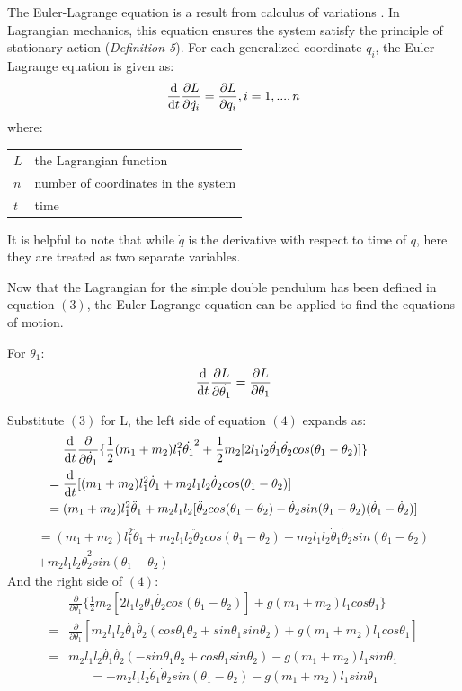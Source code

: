 \documentclass[a4paper,12pt]{article}
\makeatletter
\newenvironment{conditions}
  {\par\vspace{\abovedisplayskip}\noindent\begin{tabular}{>{$}l<{$} @{${}={}$} l}}
  {\end{tabular}\par\vspace{\belowdisplayskip}}
\makeatother
\begin{document}
The Euler-Lagrange equation is a result from calculus of variations \cite{fox-2010}. In Lagrangian mechanics, this equation ensures the system satisfy the principle of stationary action (\textit{Definition 5}). For each generalized coordinate $q_i$, the Euler-Lagrange equation is given as:
\[
\dv{}{t}\frac{\partial L}{\partial \dot{q_i}}=\frac{\partial L}{\partial q_i}, i = 1,...,n
\]
where:
\begin{conditions}
    L & the Lagrangian function\\
    n & number of coordinates in the system\\
    t & time
\end{conditions}
It is helpful to note that while $\dot{q}$ is the derivative with respect to time of $q$, here they are treated as two separate variables.

Now that the Lagrangian for the simple double pendulum has been defined in equation $(3)$, the Euler-Lagrange equation can be applied to find the equations of motion. 

For $\theta_1$:
\begin{equation}
    \dv{}{t}\frac{\partial L}{\partial \dot{\theta_1}}=\frac{\partial L}{\partial \theta_1}
    \end{equation}

Substitute $(3)$ for L, the left side of equation $(4)$ expands as:
\begin{align*}
    &\dv{}{t}\frac{\partial}{\partial \dot \theta_1}
    \{\frac{1}{2}(m_1+m_2)l_1^2\dot{\theta_1}^2+\frac{1}{2}m_2[2l_1l_2\dot{\theta_1}\dot{\theta_2}cos(\theta_1-\theta_2)]\}
    \\
    ={} &\dv{}{t}[(m_1+m_2)l_1^2\dot \theta_1+m_2l_1l_2\dot \theta_2cos(\theta_1-\theta_2)]
    \\
    ={} &(m_1+m_2)l_1^2\ddot\theta_1+m_2l_1l_2[\ddot \theta_2cos(\theta_1-\theta_2) - \dot\theta_2sin(\theta_1-\theta_2)(\dot \theta_1 - \dot \theta_2)]
\end{align*}
\begin{multline}
    =(m_1+m_2)l_1^2\ddot\theta_1+m_2l_1l_2\ddot\theta_2cos(\theta_1-\theta_2)-m_2l_1l_2\dot\theta_1\dot\theta_2sin(\theta_1-\theta_2)\\
    +m_2l_1l_2\dot\theta_2^2sin(\theta_1-\theta_2)
\end{multline}
And the right side of $(4)$:
\begin{align*}
    &\frac{\partial}{\partial \theta_1}
    \{\frac{1}{2}m_2[2l_1l_2\dot{\theta_1}\dot{\theta_2}cos(\theta_1-\theta_2)]
    +g(m_1+m_2)l_1cos\theta_1\}
    \\
    ={}&\frac{\partial}{\partial \theta_1}
    [m_2l_1l_2\dot{\theta_1}\dot{\theta_2}(cos\theta_1\theta_2+sin\theta_1sin\theta_2)
    +g(m_1+m_2)l_1cos\theta_1]
    \\
    ={}&m_2l_1l_2\dot{\theta_1}\dot{\theta_2}(-sin\theta_1\theta_2+cos\theta_1sin\theta_2)
    -g(m_1+m_2)l_1sin\theta_1
\end{align*}
\begin{equation}
    = -m_2l_1l_2\dot\theta_1 \dot\theta_2sin(\theta_1-\theta_2) -g(m_1+m_2)l_1sin\theta_1
\end{equation}
\end{document}
